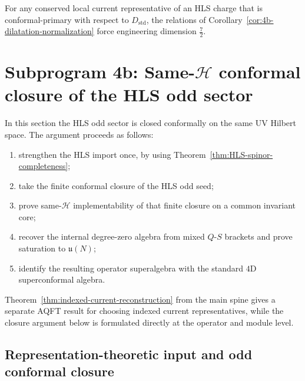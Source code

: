 \begin{remark}
For any conserved local current representative of an HLS charge that is
conformal-primary with respect to \(D_{\mathrm{std}}\), the relations of
Corollary~\ref{cor:4b-dilatation-normalization} force engineering dimension
\(\tfrac72\).
\end{remark}


\section{Subprogram 4b: Same-\texorpdfstring{$\mathcal H$}{H} conformal closure of the HLS odd sector}
\label{sec:subprogram4b}

In this section the HLS odd sector is closed conformally on the same UV Hilbert
space. The argument proceeds as follows:
\begin{enumerate}[(1)]
  \item strengthen the HLS import once, by using
        Theorem~\ref{thm:HLS-spinor-completeness};
  \item take the finite conformal closure of the HLS odd seed;
  \item prove same-\(\mathcal H\) implementability of that finite closure on a
        common invariant core;
  \item recover the internal degree-zero algebra from mixed \(Q\)-\(S\) brackets
        and prove saturation to \(\mathfrak u(N)\);
  \item identify the resulting operator superalgebra with the standard \(4\)D
        superconformal algebra.
\end{enumerate}
Theorem~\ref{thm:indexed-current-reconstruction} from the main spine gives a
separate AQFT result for choosing indexed current representatives, while the
closure argument below is formulated directly at the
operator and module level.

\subsection{Representation-theoretic input and odd conformal closure}
\label{subsec:4b-closure}

